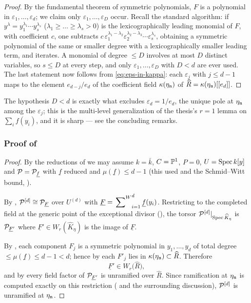\documentclass[11pt]{article}
\providecommand{\eps}{\varepsilon}                  %
\newcommand{\wv}[1]{\underline{#1}}                 %
\newcommand{\Wsum}{\sideset{}{^{W}}\sum}            %
\begin{document}
\begin{proof}
By the fundamental theorem of symmetric polynomials, $F$ is a polynomial
in $\eps_1,\dots,\eps_d$; we claim only $\eps_1,\dots,\eps_D$ occur.
Recall the standard algorithm: if $y^{\lambda}
=y_1^{\lambda_1}\cdots y_s^{\lambda_s}$
($\lambda_1\ge\dots\ge\lambda_s>0$) is the lexicographically leading
monomial of $F$, with coefficient $c$, one subtracts
$c\,\eps_{1}^{\lambda_1-\lambda_2}\eps_2^{\lambda_2-\lambda_3}\cdots
\eps_s^{\lambda_s}$, obtaining a symmetric polynomial of the same or
smaller degree with a lexicographically smaller leading term, and
iterates.  A monomial of degree $\le D$ involves at most $D$ distinct
variables, so $s\le D$ at every step, and only
$\eps_1,\dots,\eps_D$ with $D<d$ are ever used.  The last statement now
follows from \cref{eq:eps-in-kappa}: each $\eps_j$ with $j\le d-1$ maps to
the element $e_{d-j}/e_d$ of the coefficient field
$\kappa(\eta_{\mathfrak{n}})$ of $\widehat R=\kappa(\eta_{\mathfrak{n}})[[e_d]]$.
\end{proof}

\begin{rem*}
The hypothesis $D<d$ is exactly what excludes
$\eps_d=1/e_d$, the unique pole at $\eta_{\mathfrak{n}}$ among the
$\eps_j$; this is the multi-level generalization of the thesis's $r=1$
lemma on $\sum_if(y_i)$, and it is sharp --- see the concluding remarks.
\end{rem*}

\subsubsection*{Proof of }

\begin{proof}
By the reductions of  we may assume
$k=\bar k$, $C=\mathbb{P}^1$, $P=0$, $U=\operatorname{Spec} k[y]$ and $\cP=\cP_{\wv f}$ with
$\wv f$ reduced and $\mu(\wv f)\le d-1$ (this used
 and the Schmid--Witt bound,
).

By ,
$\cP^{[d]}\cong\cP_{\wv F}$ over $U^{(d)}$ with
$\wv F=\Wsum_{i=1}^d\wv f(y_i)$.  Restricting to the completed field at
the generic point of the exceptional divisor
(), the torsor
$\mathcal{P}^{[d]}|_{\operatorname{Spec}\widehat K_\eta}$ is $\cP_{\wv F'}$ where
$\wv F'\in W_r(\widehat K_\eta)$ is the image of $\wv F$.

By , each component $F_j$ is a symmetric
polynomial in $y_1,\dots,y_d$ of total degree $\le\mu(\wv f)\le d-1<d$;
hence by  each $F'_j$ lies in
$\kappa(\eta_{\mathfrak{n}})\subset\widehat R$.  Therefore
\[
\wv F'\in W_r\big(\widehat R\big),
\]
and by  every field factor of
$\cP_{\wv F'}$ is unramified over $\widehat R$.  Since ramification at
$\eta_{\mathfrak{n}}$ is computed exactly on this restriction
( and the surrounding
discussion), $\mathcal{P}^{[d]}$ is unramified at $\eta_{\mathfrak{n}}$.
\end{proof}
\end{document}
